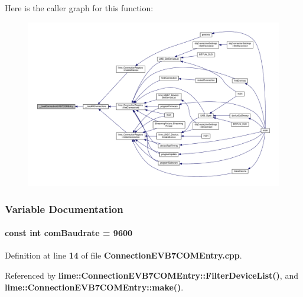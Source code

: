 Here is the caller graph for this function\+:
\nopagebreak
\begin{figure}[H]
\begin{center}
\leavevmode
\includegraphics[width=350pt]{df/d11/ConnectionEVB7COMEntry_8cpp_aafab0a44fc1f7320af30da07cb979574_icgraph}
\end{center}
\end{figure}




\subsubsection{Variable Documentation}
\paragraph[{com\+Baudrate}]{\setlength{\rightskip}{0pt plus 5cm}const {\bf int} com\+Baudrate = 9600\hspace{0.3cm}{\ttfamily [static]}}\label{ConnectionEVB7COMEntry_8cpp_a3a0465ae16a8c51a83d576bcfc81bbde}


Definition at line {\bf 14} of file {\bf Connection\+E\+V\+B7\+C\+O\+M\+Entry.\+cpp}.



Referenced by {\bf lime\+::\+Connection\+E\+V\+B7\+C\+O\+M\+Entry\+::\+Filter\+Device\+List()}, and {\bf lime\+::\+Connection\+E\+V\+B7\+C\+O\+M\+Entry\+::make()}.

